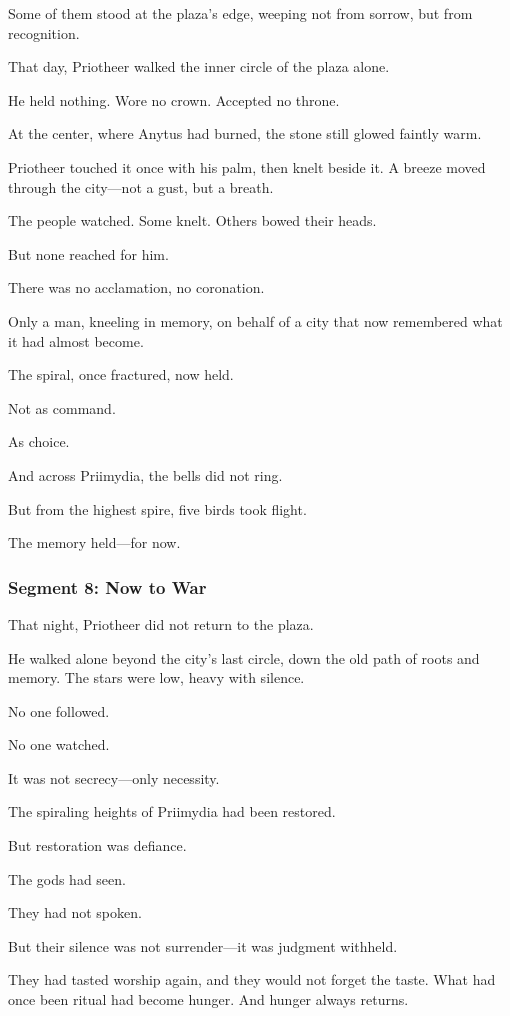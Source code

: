 \documentclass[9pt]{article}
\begin{document}
Some of them stood at the plaza’s edge, weeping not from sorrow, but from recognition.

That day, Priotheer walked the inner circle of the plaza alone.

He held nothing. Wore no crown. Accepted no throne.

At the center, where Anytus had burned, the stone still glowed faintly warm. 

Priotheer touched it once with his palm, then knelt beside it. A breeze moved through the city—not a gust, but a breath.

The people watched. Some knelt. Others bowed their heads.

But none reached for him.

There was no acclamation, no coronation. 

Only a man, kneeling in memory, on behalf of a city that now remembered what it had almost become.

The spiral, once fractured, now held.

Not as command.

As choice.

And across Priimydia, the bells did not ring.

But from the highest spire, five birds took flight.

The memory held—for now.

\newpage

\subsubsection*{Segment 8: Now to War}

That night, Priotheer did not return to the plaza.

He walked alone beyond the city’s last circle, down the old path of roots and memory. The stars were low, heavy with silence. 

No one followed.

No one watched. 

It was not secrecy—only necessity.

The spiraling heights of Priimydia had been restored. 

But restoration was defiance.

The gods had seen.

They had not spoken. 

But their silence was not surrender—it was judgment withheld. 

They had tasted worship again, and they would not forget the taste. What had once been ritual had become hunger. And hunger always returns.
\end{document}
